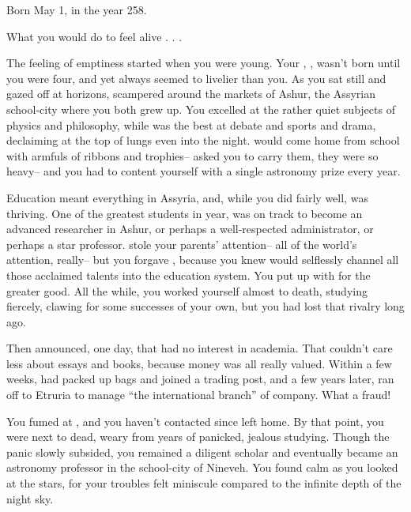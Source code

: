 \documentclass[char]{Kos}
\begin{document}
\name{\cAnarchist{}}

Born May 1, in the year 258.

What you would do to feel alive . . .

The feeling of emptiness started when you were young. Your \cMerchant{\sibling}, \cMerchant{}, wasn't born until you were four, and yet \cMerchant{\they} always seemed to livelier than you. As you sat still and gazed off at horizons, \cMerchant{\they} scampered around the markets of Ashur, the Assyrian school-city where you both grew up. You excelled at the rather quiet subjects of physics and philosophy, while \cMerchant{\they} was the best at debate and sports and drama, declaiming at the top of \cMerchant{\their} lungs even into the night. \cMerchant{\They} would come home from school with armfuls of ribbons and trophies-- \cMerchant{\they} asked you to carry them, they were so heavy-- and you had to content yourself with a single astronomy prize every year.

Education meant everything in Assyria, and, while you did fairly well, \cMerchant{} was thriving. One of the greatest students in \cMerchant{\their} year, \cMerchant{\they} was on track to become an advanced researcher in Ashur, or perhaps a well-respected administrator, or perhaps a star professor. \cMerchant{\They} stole your parents' attention-- all of the world's attention, really-- but you forgave \cMerchant{\them}, because you knew \cMerchant{\they} would selflessly channel all those acclaimed talents into the education system. You put up with \cMerchant{\them} for the greater good. All the while, you worked yourself almost to death, studying fiercely, clawing for some successes of your own, but you had lost that rivalry long ago.

Then \cMerchant{\they} announced, one day, that \cMerchant{\they} had no interest in academia. That \cMerchant{\they} couldn't care less about essays and books, because money was all \cMerchant{\they} really valued. Within a few weeks, \cMerchant{\they} had packed up \cMerchant{\their} bags and joined a trading post, and a few years later, \cMerchant{\they} ran off to Etruria to manage ``the international branch'' of \cMerchant{\their} company. What a fraud!

You fumed at \cMerchant{\them}, and you haven't contacted \cMerchant{\them} since \cMerchant{\they} left home. By that point, you were next to dead, weary from years of panicked, jealous studying. Though the panic slowly subsided, you remained a diligent scholar and eventually became an astronomy professor in the school-city of Nineveh. You found calm as you looked at the stars, for your troubles felt miniscule compared to the infinite depth of the night sky.
\end{document}
